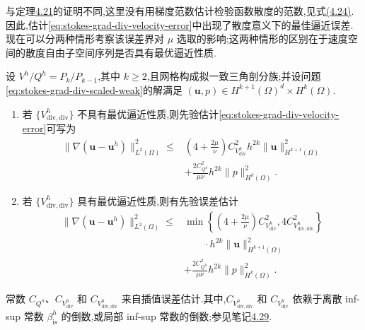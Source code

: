 \begin{note}[关于定理 4.122]\label{note:stokes-grad-div-velocity-error}
与定理\hyperref[thm:stokes-error-velocity-h1]{4.21}的证明不同,这里没有用梯度范数估计检验函数散度的范数,见式\hyperref[eq:stokes-error-eta-pressure-bound]{(4.24)}.因此,估计\cref{eq:stokes-grad-div-velocity-error}中出现了散度意义下的最佳逼近误差.现在可以分两种情形考察该误差界对 $\mu$ 选取的影响;这两种情形的区别在于速度空间的散度自由子空间序列是否具有最优逼近性质.
\end{note}

\begin{corollary}\label{cor:stokes-grad-div-taylor-hood-error}
设 $V^h/Q^h=P_k/P_{k-1}$,其中 $k\geq2$,且网格构成拟一致三角剖分族;并设问题\cref{eq:stokes-grad-div-scaled-weak}的解满足
$(\bm{u},p)\in H^{k+1}(\Omega)^d\times H^k(\Omega)$.
\begin{enumerate}[label=\roman*)]
  \item 若 $\{V_{\mathrm{div,div}}^h\}$ 不具有最优逼近性质,则先验估计\cref{eq:stokes-grad-div-velocity-error}可写为
  \begin{equation}\label{eq:stokes-grad-div-taylor-hood-error-no-optimal-div}
   \begin{aligned}
   \|\nabla(\bm{u}-\bm{u}^h)\|_{L^2(\Omega)}^2
   \leq{}&\left(4+\frac{2\mu}{\nu}\right)C_{V_{\mathrm{div}}^h}^2h^{2k}
                 \|\bm{u}\|_{H^{k+1}(\Omega)}^2\\
          &+\frac{2C_{Q^h}^2}{\mu\nu}h^{2k}\|p\|_{H^k(\Omega)}^2.
   \end{aligned}
  \end{equation}
  \item 若 $\{V_{\mathrm{div,div}}^h\}$ 具有最优逼近性质,则有先验误差估计
  \begin{equation}\label{eq:stokes-grad-div-taylor-hood-error-optimal-div}
   \begin{aligned}
   \|\nabla(\bm{u}-\bm{u}^h)\|_{L^2(\Omega)}^2
   \leq{}&\min\left\{\left(4+\frac{2\mu}{\nu}\right)C_{V_{\mathrm{div}}^h}^2,
                  4C_{V_{\mathrm{div,div}}^h}^2\right\}\\
          &\qquad\cdot h^{2k}\|\bm{u}\|_{H^{k+1}(\Omega)}^2\\
          &+\frac{2C_{Q^h}^2}{\mu\nu}h^{2k}\|p\|_{H^k(\Omega)}^2.
   \end{aligned}
  \end{equation}
\end{enumerate}
常数 $C_{Q^h}$、$C_{V_{\mathrm{div}}^h}$ 和 $C_{V_{\mathrm{div,div}}^h}$ 来自插值误差估计.其中,$C_{V_{\mathrm{div,div}}^h}$ 和 $C_{V_{\mathrm{div}}^h}$ 依赖于离散 inf-sup 常数 $\beta_{\mathrm{is}}^h$ 的倒数,或局部 inf-sup 常数的倒数;参见笔记\hyperref[note:stokes-error-infsup-dependency]{4.29}.
\end{corollary}
